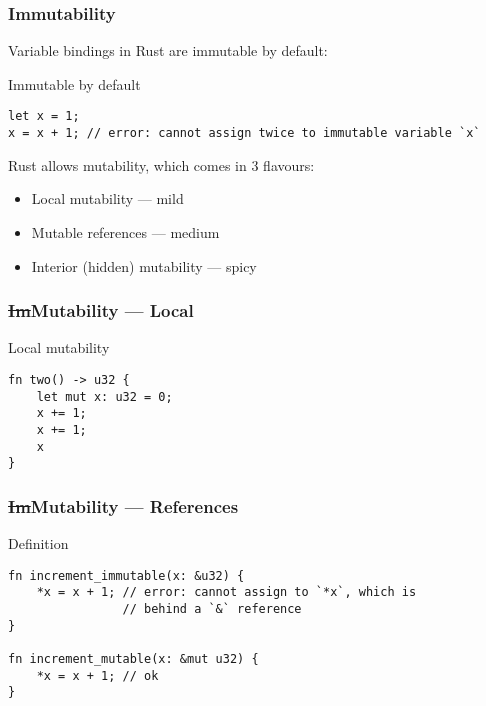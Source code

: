\documentclass[t]{beamer}
\begin{document}
\begin{frame}[fragile]
\frametitle{Immutability}

Variable bindings in Rust are immutable by default:

\begin{block}{Immutable by default}
\small
\begin{verbatim}
let x = 1;
x = x + 1; // error: cannot assign twice to immutable variable `x`
\end{verbatim}
\end{block}

\bigskip

Rust allows mutability, which comes in 3 flavours:

\begin{itemize}
\item Local mutability --- mild
\item Mutable references --- medium
\item Interior (hidden) mutability --- spicy
\end{itemize}
\end{frame}


\begin{frame}[c,fragile]
\frametitle{\st{Im}Mutability --- Local}

\begin{block}{Local mutability}
\begin{verbatim}
fn two() -> u32 {
    let mut x: u32 = 0;
    x += 1;
    x += 1;
    x
}
\end{verbatim}
\end{block}

\end{frame}


\begin{frame}[c,fragile]
\frametitle{\st{Im}Mutability --- References}

\begin{block}{Definition}
\small
\begin{verbatim}
fn increment_immutable(x: &u32) {
    *x = x + 1; // error: cannot assign to `*x`, which is
                // behind a `&` reference
}

fn increment_mutable(x: &mut u32) {
    *x = x + 1; // ok
}
\end{verbatim}
\end{block}

\end{frame}
\end{document}

